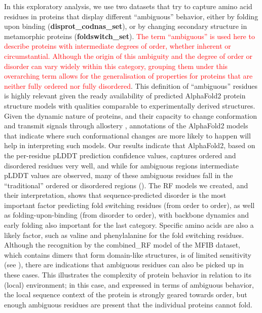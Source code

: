 In this exploratory analysis, we use two datasets that try to capture amino acid residues in proteins that display different ``ambiguous'' behavior, either by folding upon binding (\textbf{disprot_codnas_set}), or by changing secondary structure in metamorphic proteins (\textbf{foldswitch_set}). \textcolor{red}{The term ``ambiguous'' is used here to describe proteins with intermediate degrees of order, whether inherent or circumstantial. Although the origin of this ambiguity and the degree of order or disorder can vary widely within this category, grouping them under this overarching term allows for the generalisation of properties for proteins that are neither fully ordered nor fully disordered}. This definition of ``ambiguous'' residues is highly relevant given the ready availability of predicted AlphaFold2 protein structure models with qualities comparable to experimentally derived structures. Given the dynamic nature of proteins, and their capacity to change conformation and transmit signals through allostery \cite{tompa_multisteric_2014, tompa_principle_2016}, annotations of the AlphaFold2 models that indicate where such conformational changes are more likely to happen will help in interpreting such models. Our results indicate that AlphaFold2, based on the per-residue pLDDT prediction confidence values, captures ordered and disordered residues very well, and while for ambiguous regions intermediate pLDDT values are observed, many of these ambiguous residues fall in the ``traditional'' ordered or disordered regions (). The RF models we created, and their interpretation, shows that sequence-predicted disorder is the most important factor predicting fold switching residues (from order to order), as well as folding-upon-binding (from disorder to order), with backbone dynamics and early folding also important for the last category. Specific amino acids are also a likely factor, such as valine and phenylalanine for the fold switching residues. Although the recognition by the combined_RF model of the MFIB dataset, which contains dimers that form domain-like structures, is of limited sensitivity (see ), there are indications that ambiguous residues can also be picked up in these cases. This illustrates the complexity of protein behavior in relation to its (local) environment; in this case, and expressed in terms of ambiguous behavior, the local sequence context of the protein is strongly geared towards order, but enough ambiguous residues are present that the individual proteins cannot fold.

